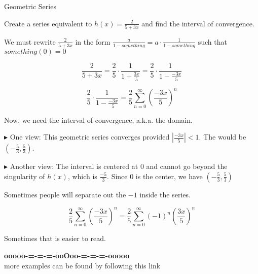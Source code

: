 \documentclass{ximera}
\begin{document}
\begin{example} Geometric Series



Create a series equivalent to $h(x) = \frac{2}{5 + 3x}$ and find the interval of convergence.



\begin{explanation}


We must rewrite $\frac{2}{5 + 3x}$ in the form $\frac{a}{1-something} = a \cdot \frac{1}{1-something}$ such that $something(0) = 0$




\[     \frac{2}{5 + 3x}  =   \frac{2}{5} \cdot \frac{1}{1 + \frac{3x}{5}}  =   \frac{2}{5} \cdot \frac{1}{1 - \frac{-3x}{5}}  \]



\[  \frac{2}{5} \cdot \frac{1}{1 - \frac{-3x}{5}}=  \frac{2}{5} \sum\limits_{n=0}^{\infty} \left(\frac{-3x}{5}\right)^n       \]





Now, we need the interval of convergence, a.k.a. the domain.  


$\blacktriangleright$ One view:  This geometric series converges provided   $\left| \frac{-3x}{5} \right| < 1$.  The would be $\left(-\frac{5}{3}, \frac{5}{3} \right)$.



$\blacktriangleright$ Another view: The interval is centered at $0$ and cannot go beyond the singularity of $h(x)$, which is $\frac{-5}{3}$.  Since $0$ is the center, we have $\left(-\frac{5}{3}, \frac{5}{3} \right)$


\end{explanation}


Sometimes people will separate out the $-1$ inside the series.

\[  \frac{2}{5} \sum\limits_{n=0}^{\infty} \left(\frac{-3x}{5}\right)^n    =   \frac{2}{5} \sum\limits_{n=0}^{\infty} (-1)^n \left(\frac{3x}{5}\right)^n   \]


Sometimes that is easier to read.


\end{example}






















\begin{center}
\textbf{\textcolor{green!50!black}{ooooo-=-=-=-ooOoo-=-=-=-ooooo}} \\

more examples can be found by following this link\\ 

\end{center}
\end{document}
